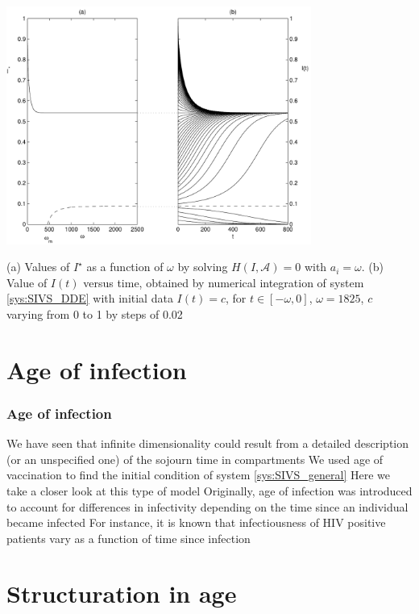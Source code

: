 \documentclass[aspectratio=169]{beamer}\usepackage[]{graphicx}\usepackage[]{xcolor}
\begin{document}
\begin{frame}
\begin{center}
   \includegraphics[width=0.75\textwidth]{FIGS/bif_and_time}
\end{center}
(a) Values of $I^\star$ as a function of $\omega$ by solving $H(I,\mathcal{A})=0$ with $a_i=\omega$. (b) Value of $I(t)$ versus time, obtained by numerical integration of system \eqref{sys:SIVS_DDE} with initial data $I(t)=c$, for $t\in[-\omega,0]$, $\omega=1825$, $c$ varying from 0 to 1 by steps of 0.02
\end{frame}


\section{Age of infection}

\begin{frame}\frametitle{Age of infection}
We have seen that infinite dimensionality could result from a detailed description (or an unspecified one) of the sojourn time in compartments
\vfill
We used age of vaccination to find the initial condition of system \eqref{sys:SIVS_general}
\vfill
Here we take a closer look at this type of model
\vfill
Originally, age of infection was introduced to account for differences in infectivity depending on the time since an individual became infected
\vfill
For instance, it is known that infectiousness of HIV positive patients vary as a function of time since infection
\end{frame}

\section{Structuration in age}
\end{document}
